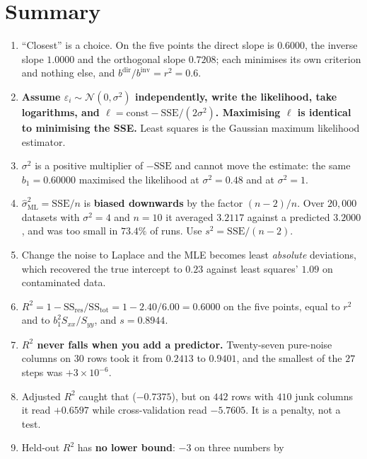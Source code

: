 \documentclass[11pt]{article}
\begin{document}
\section{Summary}

\begin{enumerate}[leftmargin=*]
  \item ``Closest'' is a choice. On the five points the direct slope is
    $0.6000$, the inverse slope $1.0000$ and the orthogonal slope $0.7208$;
    each minimises its own criterion and nothing else, and
    $b^{\mathrm{dir}}/b^{\mathrm{inv}} = r^2 = 0.6$.
  \item \textbf{Assume $\varepsilon_i \sim \mathcal{N}(0,\sigma^2)$
    independently, write the likelihood, take logarithms, and
    $\ell = \text{const} - \mathrm{SSE}/(2\sigma^2)$. Maximising $\ell$ is
    identical to minimising the SSE.} Least squares is the Gaussian maximum
    likelihood estimator.
  \item $\sigma^2$ is a positive multiplier of $-\mathrm{SSE}$ and cannot move
    the estimate: the same $b_1 = 0.60000$ maximised the likelihood at
    $\sigma^2 = 0.48$ and at $\sigma^2 = 1$.
  \item $\hat\sigma^2_{\mathrm{ML}} = \mathrm{SSE}/n$ is \textbf{biased
    downwards} by the factor $(n-2)/n$. Over $20{,}000$ datasets with
    $\sigma^2 = 4$ and $n = 10$ it averaged $3.2117$ against a predicted
    $3.2000$, and was too small in $73.4\%$ of runs. Use
    $s^2 = \mathrm{SSE}/(n-2)$.
  \item Change the noise to Laplace and the MLE becomes least \emph{absolute}
    deviations, which recovered the true intercept to $0.23$ against least
    squares' $1.09$ on contaminated data.
  \item $R^2 = 1 - \mathrm{SS_{res}}/\mathrm{SS_{tot}} = 1 - 2.40/6.00 =
    0.6000$ on the five points, equal to $r^2$ and to
    $b_1^2 S_{xx}/S_{yy}$, and $s = 0.8944$.
  \item \textbf{$R^2$ never falls when you add a predictor.} Twenty-seven
    pure-noise columns on $30$ rows took it from $0.2413$ to $0.9401$, and the
    smallest of the $27$ steps was $+3\times10^{-6}$.
  \item Adjusted $R^2$ caught that ($-0.7375$), but on $442$ rows with $410$
    junk columns it read $+0.6597$ while cross-validation read $-5.7605$. It
    is a penalty, not a test.
  \item Held-out $R^2$ has \textbf{no lower bound}: $-3$ on three numbers by

\end{enumerate}
\end{document}

